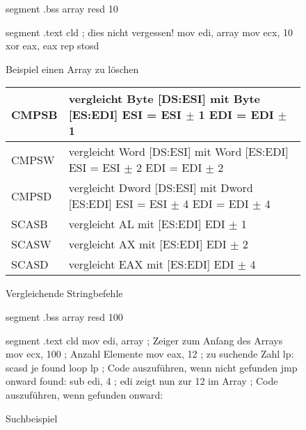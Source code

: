 \begin{figure}[ht]
\begin{AsmCodeListing}[frame=single, numbers=left]
 segment .bss
 array   resd   10

 segment .text
         cld                     ; dies nicht vergessen!
         mov    edi, array
         mov    ecx, 10
         xor    eax, eax
         rep stosd
\end{AsmCodeListing}
\caption{Beispiel einen Array zu l\"{o}schen\label{fig:zeroArrayEx}}
\end{figure}

\begin{figure}[ht]
\centering
{\code
\begin{tabular}{|lp{3.5in}|}
 \hline CMPSB & vergleicht Byte [DS:ESI] mit Byte [ES:EDI]
 \newline ESI = ESI $\pm$ 1
        \newline EDI = EDI $\pm$ 1 \\
 \hline
 CMPSW & vergleicht Word [DS:ESI] mit Word [ES:EDI] \newline ESI = ESI $\pm$ 2
        \newline EDI = EDI $\pm$ 2 \\
 \hline
 CMPSD & vergleicht Dword [DS:ESI] mit Dword [ES:EDI] \newline ESI = ESI $\pm$ 4
        \newline EDI = EDI $\pm$ 4 \\
 \hline
 SCASB & vergleicht AL mit [ES:EDI] \newline EDI $\pm$ 1 \\
 \hline
 SCASW & vergleicht AX mit [ES:EDI] \newline EDI $\pm$ 2 \\
 \hline
 SCASD & vergleicht EAX mit [ES:EDI] \newline EDI $\pm$ 4 \\
 \hline
\end{tabular}
} \caption{Vergleichende Stringbefehle \label{fig:cmpString}}
\end{figure}

\begin{figure}[ht]
\begin{AsmCodeListing}[frame=single, numbers=left, commandchars=\\\{\}]
 segment .bss
 array resd  100

 segment .text
      cld
      mov    edi, array       ; Zeiger zum Anfang des Arrays
      mov    ecx, 100         ; Anzahl Elemente
      mov    eax, 12          ; zu suchende Zahl
 lp:
      scasd                                                     \label{line:scasdSrchStrEx}
      je     found
      loop   lp
      ; Code auszuf\"{u}hren, wenn nicht gefunden
      jmp    onward
 found:
      sub    edi, 4           ; edi zeigt nun zur 12 im Array   \label{line:subSrchStrEx}
      ; Code auszuf\"{u}hren, wenn gefunden
 onward:
\end{AsmCodeListing}
\caption{Suchbeispiel \label{fig:srchStrEx}}
\end{figure}

